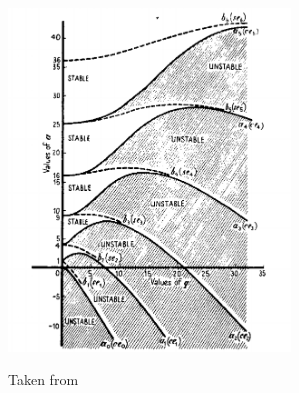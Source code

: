 \documentclass[11pt]{beamer}
\begin{document}
\begin{frame}[plain]
\hspace*{-1.5cm}\begin{minipage}{0.55\textwidth}
	\includegraphics[width=7.5cm]{Mathieu_stability.PNG} 
\end{minipage} \hfill
\begin{minipage}{0.43\textwidth}
	Taken from 
\end{minipage}
\end{frame}



\end{document}
